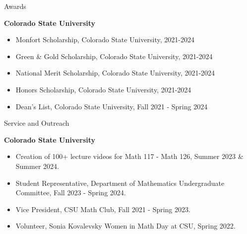 \documentclass[
	11pt, %
]{resume} %
\begin{document}

\begin{rSection}{Awards} %


	\textbf{Colorado State University}
	\begin{itemize}
		\item{Monfort Scholarship, Colorado State University, 2021-2024}
		\item{Green \& Gold Scholarship, Colorado State University, 2021-2024}
		\item{National Merit Scholarship, Colorado State University, 2021-2024}
		\item{Honors Scholarship, Colorado State University, 2021-2024}
		\item{Dean's List, Colorado State University, Fall 2021 - Spring 2024}\\
	\end{itemize}
	
\end{rSection}


\begin{rSection}{Service and Outreach}

	\textbf{Colorado State University}
	\begin{itemize}
		\item{Creation of 100+ lecture videos for Math 117 - Math 126, Summer 2023 \& Summer 2024.}
		\item{Student Representative, Department of Mathematics Undergraduate Committee, Fall 2023 - Spring 2024.}
		\item{Vice President, CSU Math Club, Fall 2021 - Spring 2023.}
		\item{Volunteer, Sonia Kovalevsky Women in Math Day at CSU, Spring 2022.}\\
	\end{itemize}
	
\end{rSection}
\end{document}
